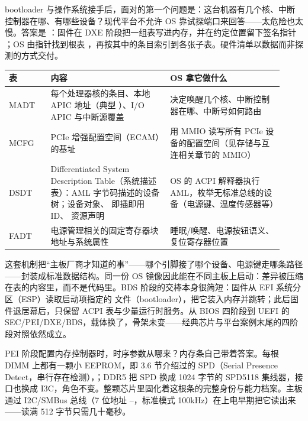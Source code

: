 bootloader 与操作系统接手后，面对的第一个问题是：这台机器有几个核、中断控制器在哪、有哪些设备？现代平台不允许 OS 靠试探端口来回答——太危险也太慢。答案是 ：固件在 DXE 阶段把一组表写进内存，并在约定位置留下签名指针 ；OS 由指针找到根表 ，再按其中的条目索引到各张子表。硬件清单以数据而非探测的方式交付。

\begin{longtable}{L{0.14\linewidth}L{0.40\linewidth}L{0.38\linewidth}}
\toprule
表 & 内容 & OS 拿它做什么 \\
\midrule
MADT & 每个处理器核的条目、本地 APIC 地址（典型 ）、I/O APIC 与中断源覆盖 & 决定唤醒几个核、中断控制器在哪、中断号如何路由 \\\tablerowrule
MCFG & PCIe 增强配置空间（ECAM）的基址 & 用 MMIO 读写所有 PCIe 设备的配置空间（见存储与互连相关章节的 MMIO） \\\tablerowrule
DSDT & Differentiated System Description Table（系统描述表）：AML 字节码描述的设备树；设备对象、 即插即用 ID、 资源声明 & OS 的 ACPI 解释器执行 AML，枚举无标准总线的设备（电源键、温度传感器等） \\\tablerowrule
FADT & 电源管理相关的固定寄存器块地址与系统属性 & 睡眠/唤醒、电源按钮语义、复位寄存器位置 \\
\bottomrule
\end{longtable}

这套机制把“主板厂商才知道的事”——哪个引脚接了哪个设备、电源键走哪条路径——封装成标准数据结构。同一份 OS 镜像因此能在不同主板上启动：差异被压缩在表的内容里，而不是代码里。BDS 阶段的交棒本身很简短：固件从 EFI 系统分区（ESP）读取启动项指定的  文件（bootloader），把它装入内存并跳转；此后固件退居幕后，只保留 ACPI 表与少量运行时服务。从 BIOS 四阶段到 UEFI 的 SEC/PEI/DXE/BDS，载体换了，骨架未变——经典芯片与平台案例末尾的四阶段对照依然成立。


PEI 阶段配置内存控制器时，时序参数从哪来？内存条自己带着答案。每根 DIMM 上都有一颗小 EEPROM，即 3.6 节介绍过的 SPD（Serial Presence Detect，串行存在检测），；DDR5 把 SPD 换成 1024 字节的 SPD5118 集线器，接口也换成 I3C，角色不变。整颗芯片里固化着这根条的完整身份与能力档案。主板通过 I2C/SMBus 总线（7 位地址 --，标准模式 100kHz）在上电早期把它读出来——读满 512 字节只需几十毫秒。


